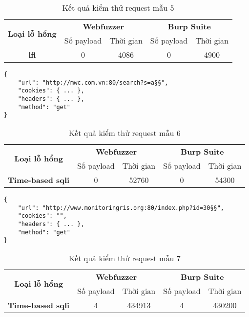 \FloatBarrier
\begin{table}[ht]
    \centering
    \caption{Kết quả kiểm thử request mẫu 5}
    \label{tab:testing-result-5}
    \begin{tabular}[ht]{ccccc}
        \toprule[1pt]\midrule[0.3pt]
            \multirow{2}{*}{\textbf{Loại lỗ hổng}}&\multicolumn{2}{c}{\textbf{Webfuzzer}}&\multicolumn{2}{c}{\textbf{Burp Suite}}\\
            \cmidrule(lr){2-3}\cmidrule(lr){4-5}{}&Số payload&Thời gian&Số payload&Thời gian\\
        \midrule[0.3pt]
            \textbf{\acrshort{lfi}}&0&4086&0&4900\\
        \midrule[0.3pt]\bottomrule[1pt]
    \end{tabular}
\end{table}
\FloatBarrier
\begin{lstlisting}[style=ES6, label={lst:base-request-6}, caption={Request mẫu 6}]
{
    "url": "http://mwc.com.vn:80/search?s=a§§",
    "cookies": { ... },
    "headers": { ... },
    "method": "get"
}
\end{lstlisting}
\FloatBarrier
\begin{table}[ht]
    \centering
    \caption{Kết quả kiểm thử request mẫu 6}
    \label{tab:testing-result-6}
    \begin{tabular}[ht]{ccccc}
        \toprule[1pt]\midrule[0.3pt]
            \multirow{2}{*}{\textbf{Loại lỗ hổng}}&\multicolumn{2}{c}{\textbf{Webfuzzer}}&\multicolumn{2}{c}{\textbf{Burp Suite}}\\
            \cmidrule(lr){2-3}\cmidrule(lr){4-5}{}&Số payload&Thời gian&Số payload&Thời gian\\
        \midrule[0.3pt]
            \textbf{Time-based \acrshort{sqli}}&0&52760&0&54300\\
        \midrule[0.3pt]\bottomrule[1pt]
    \end{tabular}
\end{table}
\FloatBarrier
\begin{lstlisting}[style=ES6, label={lst:base-request-7}, caption={Request mẫu 7 có lỗ hổng time-based \acrshort{sqli}}]
{
    "url": "http://www.monitoringris.org:80/index.php?id=30§§",
    "cookies": "",
    "headers": { ... },
    "method": "get"
}
\end{lstlisting}
\FloatBarrier
\begin{table}[ht]
    \centering
    \caption{Kết quả kiểm thử request mẫu 7}
    \label{tab:testing-result-7}
    \begin{tabular}[ht]{ccccc}
        \toprule[1pt]\midrule[0.3pt]
            \multirow{2}{*}{\textbf{Loại lỗ hổng}}&\multicolumn{2}{c}{\textbf{Webfuzzer}}&\multicolumn{2}{c}{\textbf{Burp Suite}}\\
            \cmidrule(lr){2-3}\cmidrule(lr){4-5}{}&Số payload&Thời gian&Số payload&Thời gian\\
        \midrule[0.3pt]
            \textbf{Time-based \acrshort{sqli}}&4&434913&4&430200\\
        \midrule[0.3pt]\bottomrule[1pt]
    \end{tabular}
\end{table}
